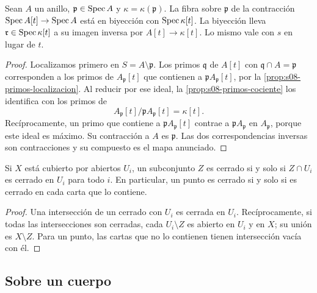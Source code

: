 \begin{lema}
\label{lema:s08-fibra-recta-afin}
Sean $A$ un anillo, $\mathfrak p\in\operatorname{Spec} A$ y $\kappa=\kappa(\mathfrak p)$. La fibra sobre $\mathfrak p$ de la contracción $\operatorname{Spec} A[t]\to\operatorname{Spec} A$ está en biyección con $\operatorname{Spec}\kappa[t]$. La biyección lleva $\mathfrak r\in\operatorname{Spec}\kappa[t]$ a su imagen inversa por $A[t]\to\kappa[t]$. Lo mismo vale con $s$ en lugar de $t$.
\end{lema}
\begin{proof}
Localizamos primero en $S=A\setminus\mathfrak p$. Los primos $\mathfrak q$ de $A[t]$ con $\mathfrak q\cap A=\mathfrak p$ corresponden a los primos de $A_{\mathfrak p}[t]$ que contienen a $\mathfrak pA_{\mathfrak p}[t]$, por la \cref{prop:s08-primos-localizacion}. Al reducir por ese ideal, la \cref{prop:s08-primos-cociente} los identifica con los primos de
\[
A_{\mathfrak p}[t]/\mathfrak pA_{\mathfrak p}[t]=\kappa[t].
\]
Recíprocamente, un primo que contiene a $\mathfrak pA_{\mathfrak p}[t]$ contrae a $\mathfrak pA_{\mathfrak p}$ en $A_{\mathfrak p}$, porque este ideal es máximo. Su contracción a $A$ es $\mathfrak p$. Las dos correspondencias inversas son contracciones y su compuesto es el mapa anunciado.
\end{proof}

\begin{lema}
\label{lema:s08-cerrados-cartas}
Si $X$ está cubierto por abiertos $U_i$, un subconjunto $Z$ es cerrado si y solo si $Z\cap U_i$ es cerrado en $U_i$ para todo $i$. En particular, un punto es cerrado si y solo si es cerrado en cada carta que lo contiene.
\end{lema}
\begin{proof}
Una intersección de un cerrado con $U_i$ es cerrada en $U_i$. Recíprocamente, si todas las intersecciones son cerradas, cada $U_i\setminus Z$ es abierto en $U_i$ y en $X$; su unión es $X\setminus Z$. Para un punto, las cartas que no lo contienen tienen intersección vacía con él.
\end{proof}

\subsection{Sobre un cuerpo}


